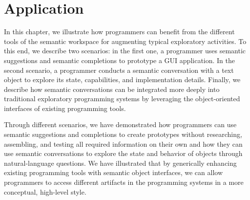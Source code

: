 
\chapter{Application}
\label{cha:application}

In this chapter, we illustrate how programmers can benefit from the different tools of the semantic workspace for augmenting typical exploratory activities.
To this end, we describe two scenarios: in the first one, a programmer uses semantic suggestions and semantic completions to prototype a GUI application.
In the second scenario, a programmer conducts a semantic conversation with a text object to explore its state, capabilities, and implementation details.
Finally, we describe how semantic conversations can be integrated more deeply into traditional exploratory programming systems by leveraging the object-oriented interfaces of existing programming tools.


\begin{summary}
	Through different scenarios, we have demonstrated how programmers can use semantic suggestions and completions to create prototypes without researching, assembling, and testing all required information on their own and how they can use semantic conversations to explore the state and behavior of objects through natural-language questions.
	We have illustrated that by generically enhancing existing programming tools with semantic object interfaces, we can allow programmers to access different artifacts in the programming systems in a more conceptual, high-level style.
\end{summary}
